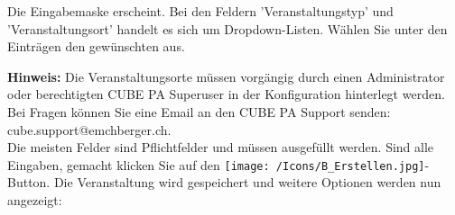 Die Eingabemaske erscheint. Bei den Feldern 'Veranstaltungstyp' und 'Veranstaltungsort' handelt es sich um Dropdown-Listen. Wählen Sie unter den Einträgen den gewünschten aus.

\vspace{\baselineskip}

\textbf{Hinweis:} Die Veranstaltungsorte müssen vorgängig durch einen Administrator oder berechtigten CUBE PA Superuser in der Konfiguration hinterlegt werden. Bei Fragen können Sie eine Email an den CUBE PA Support senden: {\color{red} cube.support@emchberger.ch}.\\
Die meisten Felder sind Pflichtfelder und müssen ausgefüllt werden. Sind alle Eingaben, gemacht klicken Sie auf den \texttt{[image: /Icons/B\_Erstellen.jpg]}-Button. Die Veranstaltung wird gespeichert und weitere Optionen werden nun angezeigt:

\vspace{\baselineskip}


